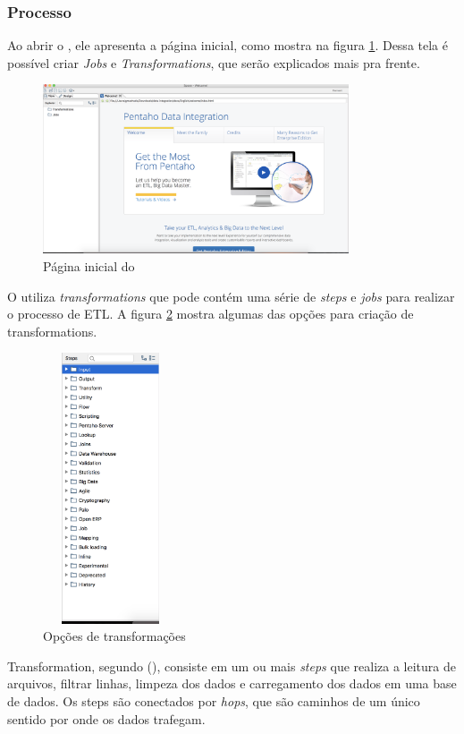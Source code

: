 \subsubsection{Processo}
Ao abrir o \pdi, ele apresenta a página inicial, como mostra na figura \ref{initialpdi}. Dessa tela é possível criar \textit{Jobs} e \textit{Transformations}, que serão explicados mais pra frente. 
\begin{figure}[H]
\centering
\includegraphics[height=5cm]{imagens/pagina_principal_pentaho.png}
\caption{Página inicial do \pdi}
\label{initialpdi}
\end{figure}
O \pdi utiliza \textit{transformations} que pode contém uma série de \textit{steps} e \textit{jobs} para realizar o processo de ETL. A figura \ref{transformationOptions} mostra algumas das opções para criação de transformations.
\begin{figure}[H]
\centering
\includegraphics[width=4cm, height=8cm]{imagens/opcoes_de_transformacao.png}
\caption{Opções de transformações}
\label{transformationOptions}

\end{figure}
Transformation, segundo \citeauthor{kettle} (\citeyear{kettle}), consiste em um ou mais \textit{steps} que realiza a leitura de arquivos, filtrar linhas, limpeza dos dados e carregamento dos dados em uma base de dados. Os steps são conectados por \textit{hops}, que são caminhos de um único sentido por onde os dados trafegam. 
